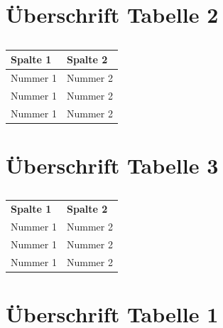 \vspace{\parskip}
\section*{Überschrift Tabelle 2}

\begin{table}[!h]
\hspace{-5pt}
\begin{tabularx}{\textwidth + 5pt}{| @{\hspace{3pt}} M | @{\hspace{3pt}} M |}
\hline
\textbf{Spalte 1} & \textbf{Spalte 2} \\
\hline
Nummer 1 & Nummer 2 \\
\hline
Nummer 1 & Nummer 2 \\
\hline
Nummer 1 & Nummer 2 \\
\hline
\end{tabularx}
\caption{}
\end{table}


\vspace{\parskip}
\section*{Überschrift Tabelle 3}

\begin{table}[!h]
\begin{tabularx}{\textwidth}{@{} M M}
\textbf{Spalte 1} & \textbf{Spalte 2} \\
Nummer 1 & Nummer 2 \\
Nummer 1 & Nummer 2 \\
Nummer 1 & Nummer 2 \\
\end{tabularx}
\caption{}
\end{table}

\clearpage


\vspace{22mm}
\section*{Überschrift Tabelle 1}

